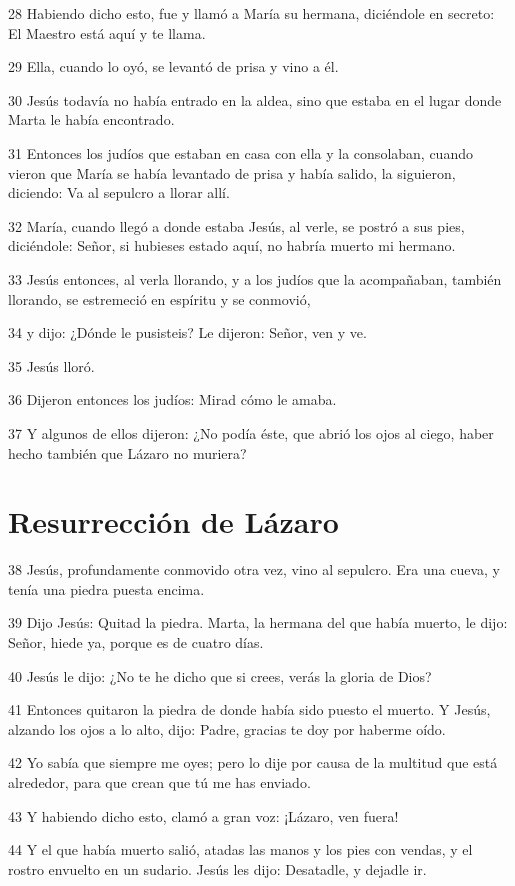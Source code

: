 \par 28 Habiendo dicho esto, fue y llamó a María su hermana, diciéndole en secreto: El Maestro está aquí y te llama.
\par 29 Ella, cuando lo oyó, se levantó de prisa y vino a él.
\par 30 Jesús todavía no había entrado en la aldea, sino que estaba en el lugar donde Marta le había encontrado.
\par 31 Entonces los judíos que estaban en casa con ella y la consolaban, cuando vieron que María se había levantado de prisa y había salido, la siguieron, diciendo: Va al sepulcro a llorar allí.
\par 32 María, cuando llegó a donde estaba Jesús, al verle, se postró a sus pies, diciéndole: Señor, si hubieses estado aquí, no habría muerto mi hermano.
\par 33 Jesús entonces, al verla llorando, y a los judíos que la acompañaban, también llorando, se estremeció en espíritu y se conmovió,
\par 34 y dijo: ¿Dónde le pusisteis? Le dijeron: Señor, ven y ve.
\par 35 Jesús lloró.
\par 36 Dijeron entonces los judíos: Mirad cómo le amaba.
\par 37 Y algunos de ellos dijeron: ¿No podía éste, que abrió los ojos al ciego, haber hecho también que Lázaro no muriera?

\section*{Resurrección de Lázaro}

\par 38 Jesús, profundamente conmovido otra vez, vino al sepulcro. Era una cueva, y tenía una piedra puesta encima.
\par 39 Dijo Jesús: Quitad la piedra. Marta, la hermana del que había muerto, le dijo: Señor, hiede ya, porque es de cuatro días.
\par 40 Jesús le dijo: ¿No te he dicho que si crees, verás la gloria de Dios?
\par 41 Entonces quitaron la piedra de donde había sido puesto el muerto. Y Jesús, alzando los ojos a lo alto, dijo: Padre, gracias te doy por haberme oído.
\par 42 Yo sabía que siempre me oyes; pero lo dije por causa de la multitud que está alrededor, para que crean que tú me has enviado.
\par 43 Y habiendo dicho esto, clamó a gran voz: ¡Lázaro, ven fuera!
\par 44 Y el que había muerto salió, atadas las manos y los pies con vendas, y el rostro envuelto en un sudario. Jesús les dijo: Desatadle, y dejadle ir.

